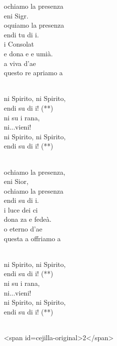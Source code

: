 \begin{cancion}%
	ochiamo la  presenza \\
	eni Sigr.\\
	oquiamo la  presenza\\
	endi tu di i.\\
	i Consolat\\
	e dona e e umià.\\
	a viva d'ae\\
	questo re apriamo a  \\\jump\\
	\begin{chorus}%
	ni Spirito, ni Spirito,\\
	endi su di i! (**)\\
	ni su i rana, \\
	ni...vieni!\\
	ni Spirito, ni Spirito,\\
	endi su di i! (**)\\
	\end{chorus}%
	\jump\\
	ochiamo la  presenza,\\
	eni Sior,\\
	ochiamo la  presenza\\
	endi su di i.\\
	i luce dei ci\\
	dona za e fedeà.\\
	o eterno d'ae\\
	questa a offriamo a  \\\jump\\
	\begin{chorus}%
	ni Spirito, ni Spirito,\\
	endi su di i! (**)\\
	ni su i rana, \\
	ni...vieni!\\
	ni Spirito, ni Spirito,\\
	endi su di i! (**)\\
	\end{chorus}%
	\jump\\
<span id=cejilla-original>2</span>\\
\end{cancion}%
